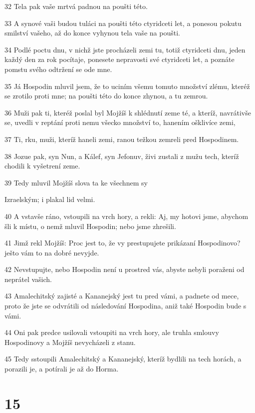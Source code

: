\par 32 Tela pak vaše mrtvá padnou na poušti této.
\par 33 A synové vaši budou tuláci na poušti této ctyridceti let, a ponesou pokutu smilství vašeho, až do konce vyhynou tela vaše na poušti.
\par 34 Podlé poctu dnu, v nichž jste procházeli zemi tu, totiž ctyridceti dnu, jeden každý den za rok pocítaje, ponesete nepravosti své ctyridceti let, a poznáte pomstu svého odtržení se ode mne.
\par 35 Já Hospodin mluvil jsem, že to uciním všemu tomuto množství zlému, kteréž se zrotilo proti mne; na poušti této do konce zhynou, a tu zemrou.
\par 36 Muži pak ti, kteréž poslal byl Mojžíš k shlédnutí zeme té, a kteríž, navrátivše se, uvedli v reptání proti nemu všecko množství to, hanením ošklivíce zemi,
\par 37 Ti, rku, muži, kteríž haneli zemi, ranou težkou zemreli pred Hospodinem.
\par 38 Jozue pak, syn Nun, a Kálef, syn Jefonuv, živi zustali z mužu tech, kteríž chodili k vyšetrení zeme.
\par 39 Tedy mluvil Mojžíš slova ta ke všechnem sy\par Izraelským; i plakal lid velmi.
\par 40 A vstavše ráno, vstoupili na vrch hory, a rekli: Aj, my hotovi jsme, abychom šli k místu, o nemž mluvil Hospodin; nebo jsme zhrešili.
\par 41 Jimž rekl Mojžíš: Proc jest to, že vy prestupujete prikázaní Hospodinovo? ješto vám to na dobré nevyjde.
\par 42 Nevstupujte, nebo Hospodin není u prostred vás, abyste nebyli poraženi od neprátel vašich.
\par 43 Amalechitský zajisté a Kananejský jest tu pred vámi, a padnete od mece, proto že jste se odvrátili od následování Hospodina, aniž také Hospodin bude s vámi.
\par 44 Oni pak predce usilovali vstoupiti na vrch hory, ale truhla smlouvy Hospodinovy a Mojžíš nevycházeli z stanu.
\par 45 Tedy sstoupili Amalechitský a Kananejský, kteríž bydlili na tech horách, a porazili je, a potírali je až do Horma.

\chapter{15}

